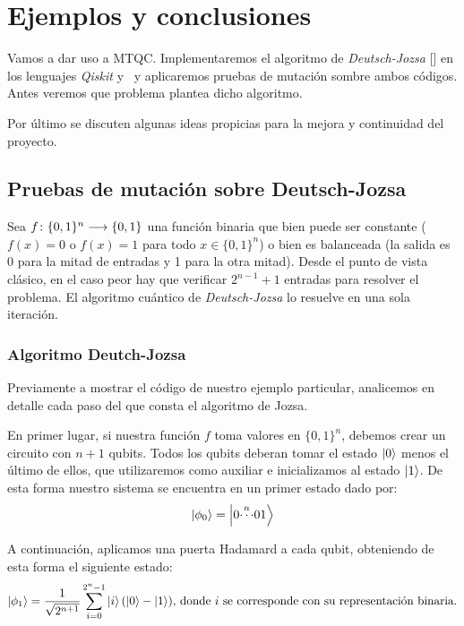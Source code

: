\chapter{Ejemplos y conclusiones}

Vamos a dar uso a MTQC. Implementaremos el algoritmo de \textit{Deutsch-Jozsa} [\cite{deutsch1992rapid}] en los lenguajes \textit{Qiskit} y \qsh\ y aplicaremos pruebas de mutación sombre ambos códigos. Antes veremos que problema plantea dicho algoritmo.

Por último se discuten algunas ideas propicias para la mejora y continuidad del proyecto.

\section{Pruebas de mutación sobre Deutsch-Jozsa}

Sea $f\colon \{0,1\}^n\longrightarrow \{0,1\}$ una función binaria que bien puede ser constante ($f(x) = 0$ o $f(x) = 1$ para todo $x\in\{0,1\}^n$) o bien es balanceada (la salida es 0 para la mitad de entradas y 1 para la otra mitad). Desde el punto de vista clásico, en el caso peor hay que verificar $2^{n-1}+1$ entradas para resolver el problema. El algoritmo cuántico de \textit{Deutsch-Jozsa} lo resuelve en una sola iteración.

\subsection{Algoritmo Deutch-Jozsa}

Previamente a mostrar el código de nuestro ejemplo particular, analicemos en detalle cada paso del que consta el algoritmo de Jozsa.

En primer lugar, si nuestra función $f$ toma valores en $\{0,1\}^n$, debemos crear un circuito con $n + 1$ qubits. Todos los qubits deberan tomar el estado $\left|0\right\rangle$ menos el último de ellos, que utilizaremos como auxiliar e inicializamos al estado $\left|1\right\rangle$. De esta forma nuestro sistema se encuentra en un primer estado dado por:
\begin{equation}
\left|\phi_0\right\rangle = \left|0\overset{n}{\cdots}01\right\rangle
\end{equation}

A continuación, aplicamos una puerta Hadamard a cada qubit, obteniendo de esta forma el siguiente estado:
\begin{equation}
\left|\phi_1\right\rangle = \dfrac{1}{\sqrt{2^{n+1}}} \sum\limits_{i=0}^{2^n - 1} \left|i\right\rangle(\left|0\right\rangle-\left|1\right\rangle) \textrm{, donde $i$ se corresponde con su representación binaria.}
\end{equation}

